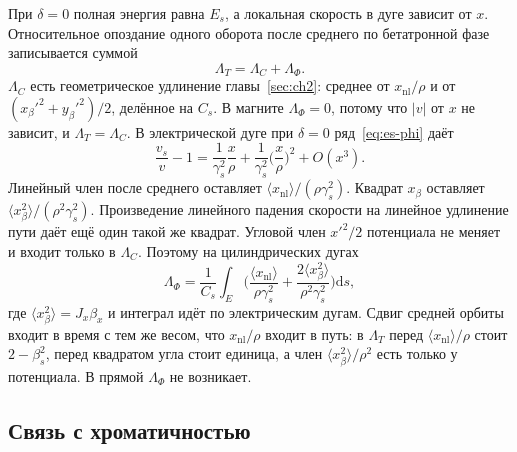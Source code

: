 При $\delta=0$ полная энергия равна $E_s$, а локальная скорость в дуге зависит от $x$. Относительное опоздание одного оборота после среднего по бетатронной фазе записывается суммой
\begin{equation}
\label{eq:es-LT}
\Lambda_T=\Lambda_C+\Lambda_\Phi.
\end{equation}
$\Lambda_C$ есть геометрическое удлинение главы~\ref{sec:ch2}: среднее от $x_{\mathrm{nl}}/\rho$ и от $(x_\beta'^2+y_\beta'^2)/2$, делённое на $C_s$. В магните $\Lambda_\Phi=0$, потому что $|v|$ от $x$ не зависит, и $\Lambda_T=\Lambda_C$. В электрической дуге при $\delta=0$ ряд~\eqref{eq:es-phi} даёт
\begin{equation}
\label{eq:es-v-beta}
\frac{v_s}{v}-1
=\frac{1}{\gamma_s^2}\frac{x}{\rho}
+\frac{1}{\gamma_s^2}\Biggl(\frac{x}{\rho}\Biggr)^2
+O(x^3).
\end{equation}
Линейный член после среднего оставляет $\langle x_{\mathrm{nl}}\rangle/(\rho\gamma_s^2)$. Квадрат $x_\beta$ оставляет $\langle x_\beta^2\rangle/(\rho^2\gamma_s^2)$. Произведение линейного падения скорости на линейное удлинение пути даёт ещё один такой же квадрат. Угловой член $x'^2/2$ потенциала не меняет и входит только в $\Lambda_C$. Поэтому на цилиндрических дугах
\begin{equation}
\label{eq:es-Lphi}
\Lambda_\Phi
=\frac{1}{C_s}
\int_{E}
\Biggl(
\frac{\langle x_{\mathrm{nl}}\rangle}{\rho\gamma_s^2}
+\frac{2\langle x_\beta^2\rangle}{\rho^2\gamma_s^2}
\Biggr)\mathrm{d}s,
\end{equation}
где $\langle x_\beta^2\rangle=J_x\beta_x$ и интеграл идёт по электрическим дугам. Сдвиг средней орбиты входит в время с тем же весом, что $x_{\mathrm{nl}}/\rho$ входит в путь: в $\Lambda_T$ перед $\langle x_{\mathrm{nl}}\rangle/\rho$ стоит $2-\beta_s^2$, перед квадратом угла стоит единица, а член $\langle x_\beta^2\rangle/\rho^2$ есть только у потенциала. В прямой $\Lambda_\Phi$ не возникает.

\subsection{Связь с хроматичностью}
\label{sec:es-xi}

